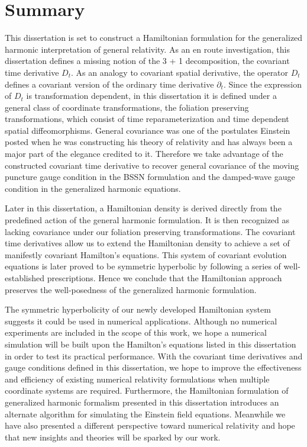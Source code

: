 \chapter{Summary}\label{summary}
This dissertation is set to construct a Hamiltonian formulation for the generalized harmonic interpretation of general relativity. As an en route investigation, this dissertation defines a missing notion of the 3 + 1 decomposition, the covariant time derivative $D_{t}$. As an analogy to covariant spatial derivative, the operator $D_{t}$ defines a covariant version of the ordinary time derivative $\partial_{t}$. Since the expression of $D_{t}$ is transformation dependent, in this dissertation it is defined under a general class of coordinate transformations, the foliation preserving transformations, which consist of time reparameterization and time dependent spatial diffeomorphisms. General covariance was one of the postulates Einstein posted when he was constructing his theory of relativity and has always been a major part of the elegance credited to it. Therefore we take advantage of the constructed covariant time derivative to recover general covariance of the moving puncture gauge condition in the BSSN formulation and the damped-wave gauge condition in the generalized harmonic equations. 

Later in this dissertation, a Hamiltonian density is derived directly from the predefined action of the general harmonic formulation. It is then recognized as lacking covariance under our foliation preserving transformations. The covariant time derivatives allow us to extend the Hamiltonian density to achieve a set of manifestly covariant Hamilton's equations. This system of covariant evolution equations is later proved to be symmetric hyperbolic by following a series of well-established prescriptions. Hence we conclude that the Hamiltonian approach preserves the well-posedness of the generalized harmonic formulation. 

The symmetric hyperbolicity of our newly developed Hamiltonian system suggests it could be used in numerical applications. Although no numerical experiments are included in the scope of this work, we hope a numerical simulation will be built upon the Hamilton's equations listed in this dissertation in order to test its practical performance. With the covariant time derivatives and gauge conditions defined in this dissertation, we hope to improve the effectiveness and efficiency of existing numerical relativity formulations when multiple coordinate systems are required. Furthermore, the Hamiltonian formulation of generalized harmonic formalism presented in this dissertation introduces an alternate algorithm for simulating the Einstein field equations. Meanwhile we have also presented a different perspective toward numerical relativity and hope that new insights and theories will be sparked by our work. 